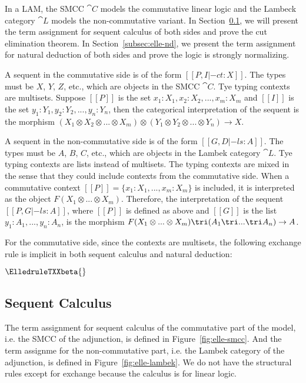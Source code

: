 In a LAM, the SMCC $\cat{C}$ models the commutative linear logic and the Lambeck category
$\cat{L}$ models the non-commutative variant. In Section~\ref{subsec:elle}, we will present the
term assignment for sequent calculus of both sides and prove the cut elimination theorem. In
Section~\ref{subsec:elle-nd}, we present the term assignment for natural deduction of both sides
and prove the logic is strongly normalizing.

A sequent in the commutative side is of the form $[[P,I |-c t : X]]$. The types must be $X$,
$Y$, $Z$, etc., which are objects in the SMCC $\cat{C}$. Tye typing contexts are multisets.
Suppose $[[P]]$ is the set $x_1:X_1, x_2:X_2, ..., x_m:X_m$ and $[[I]]$ is the set
$y_1:Y_1, y_2:Y_2,...,y_n:Y_n$, then the categorical interpretation of the sequent is the
morphism $(X_1\otimes X_2\otimes...\otimes X_m)\otimes(Y_1\otimes Y_2\otimes...\otimes Y_n)\rightarrow X$.

A sequent in the non-commutative side is of the form $[[G,D |-l s : A]]$. The types must be $A$,
$B$, $C$, etc., which are objects in the Lambek category $\cat{L}$. Tye typing contexts are
lists instead of multisets. The typing contexts are mixed in the sense that they could include
contexts from the commutative side. When a commutative context $[[P]]=\{x_1:X_1,...,x_m:X_m\}$
is included, it is interpreted as the object $F(X_1\otimes...\otimes X_m)$. Therefore, the
interpretation of the sequent $[[P,G |-l s : A]]$, where $[[P]]$ is defined as above and $[[G]]$
is the list $y_1:A_1,...,y_n:A_n$, is the morphism
$F(X_1\otimes...\otimes X_m)\tri(A_1\tri...\tri A_n)\rightarrow A$.

For the commutative side, since the contexts are multisets, the following exchange rule
is implicit in both sequent calculus and natural deduction:

\begin{center}
  \scriptsize
  $\ElledruleTXXbeta{}$
\end{center}



\subsection{Sequent Calculus}
\label{subsec:elle}

The term assignment for sequent calculus of the commutative part of the model, i.e. the SMCC of
the adjunction, is defined in Figure~\ref{fig:elle-smcc}. And the term assignme for the
non-commutative part, i.e. the Lambek category of the adjunction, is defined in
Figure~\ref{fig:elle-lambek}. We do not have the structural rules except for exchange because
the calculus is for linear logic. 


